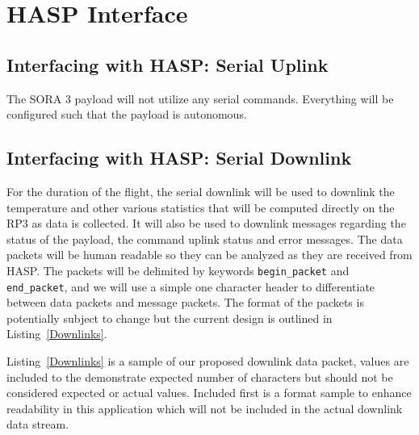 \section{HASP Interface}
\label{sec:HaspInterface}

\subsection{Interfacing with HASP: Serial Uplink}
The SORA 3 payload will not utilize any serial commands. Everything will be configured such that the payload is autonomous.

\subsection{Interfacing with HASP: Serial Downlink}
For the duration of the flight, the serial downlink will be used to downlink the temperature and other various statistics that will be computed directly on the RP\num{3} as data is collected. It will also be used to downlink messages regarding the status of the payload, the command uplink status and error messages. The data packets will be human readable so they can be analyzed as they are received from HASP. The packets will be delimited by keywords \verb|begin_packet| and \verb|end_packet|, and we will use a simple one character header to differentiate between data packets and message packets. The format of the packets is potentially subject to change but the current design is outlined in Listing~\ref{Downlinks}.

Listing~\ref{Downlinks} is a sample of our proposed downlink data packet, values are included to the demonstrate expected number of characters but should not be considered expected or actual values. Included first is a format sample to enhance readability in this application which will not be included in the actual downlink data stream.


